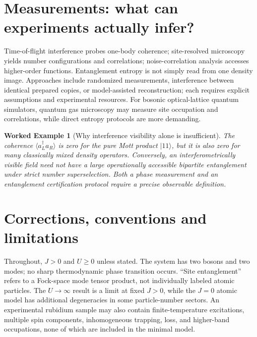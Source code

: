 \documentclass[11pt,a4paper]{article}
\newtheorem{example}{Worked Example}
\begin{document}
\section{Measurements: what can experiments actually infer?}
Time-of-flight interference probes one-body coherence; site-resolved microscopy yields number configurations and correlations; noise-correlation analysis accesses higher-order functions. Entanglement entropy is not simply read from one density image. Approaches include randomized measurements, interference between identical prepared copies, or model-assisted reconstruction; each requires explicit assumptions and experimental resources. For bosonic optical-lattice quantum simulators, quantum gas microscopy may measure site occupation and correlations, while direct entropy protocols are more demanding.
\begin{example}[Why interference visibility alone is insufficient]
The coherence $\langle a_L^\dagger a_R\rangle$ is zero for the pure Mott product $|11\rangle$, but it is also zero for many classically mixed density operators. Conversely, an interferometrically visible field need not have a large \emph{operationally accessible} bipartite entanglement under strict number superselection. Both a phase measurement and an entanglement certification protocol require a precise observable definition.
\end{example}
\section{Corrections, conventions and limitations}
Throughout, $J>0$ and $U\ge0$ unless stated. The system has two bosons and two modes; no sharp thermodynamic phase transition occurs. ``Site entanglement'' refers to a Fock-space mode tensor product, not individually labeled atomic particles. The $U\to\infty$ result is a limit at fixed $J>0$, while the $J=0$ atomic model has additional degeneracies in some particle-number sectors. An experimental rubidium sample may also contain finite-temperature excitations, multiple spin components, inhomogeneous trapping, loss, and higher-band occupations, none of which are included in the minimal model.
\end{document}
